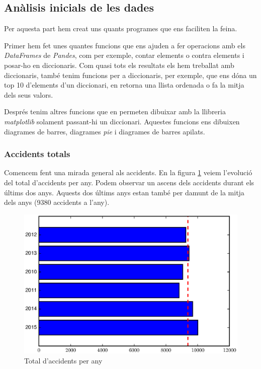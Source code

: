 \subsection{Anàlisis inicials de les dades}
Per aquesta part hem creat uns quants programes que ens faciliten la feina.

Primer hem fet unes quantes funcions que ens ajuden a fer operacions amb els \textit{DataFrames} de \textit{Pandes}, com per exemple, contar elements o contra elements i posar-ho en diccionaris. Com quasi tots els resultats els hem treballat amb diccionaris, també tenim funcions per a diccionaris, per exemple, que ens dóna un top 10 d'elements d'un diccionari, en retorna una llista ordenada o fa la mitja dels seus valors.

Després tenim altres funcions que en permeten dibuixar amb la llibreria \textit{matplotlib} solament passant-hi un diccionari. Aquestes funcions ens dibuixen diagrames de barres, diagrames \textit{pie} i diagrames de barres apilats.

\subsubsection*{Accidents totals}
Comencem fent una mirada general als accidents. En la figura \ref{fig:totalaccidentsany}  veiem l'evolució del total d'accidents per any. Podem observar un ascens dels accidents durant els últims dos anys. Aquests dos últims anys estan també per damunt de la mitja dels anys (9380 accidents a l'any).

\begin{figure}[H]
	\centering
	\includegraphics[scale=0.7]{figuras/TotalAccidentsPerAny.eps}
	\caption{Total d'accidents per any}
    \label{fig:totalaccidentsany}
\end{figure}

